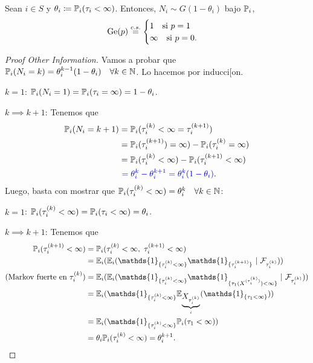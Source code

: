 \begin{prop}
	Sean $i \in S$ y $\theta_{i} \coloneq \mathbb{P}_{i}(\tau_{i} < \infty)$. Entonces, $N_{i} \sim G(1 - \theta_{i})$ bajo $\mathbb{P}_{i}$,
	\[ \operatorname{Ge}(p) \stackrel{c.s.}{=} \begin{cases}
		1 \quad \text{si } p = 1 \\
		\infty \quad \text{si } p = 0.
	\end{cases} \]
\end{prop}
\begin{proof}[Proof Other Information]
	Vamos a probar que $\mathbb{P}_{i}(N_{i} = k) = \theta_{i}^{k-1}(1 - \theta_{i}) \quad \forall k \in \mathbb{N}$. Lo hacemos por inducci[on. \par
	\underline{$k=1$}: $\mathbb{P}_{i}(N_{i} = 1) = \mathbb{P}_{i}(\tau_{i} = \infty) = 1 - \theta_{i}$. \checkmark \par
	\underline{$k \implies k+1$}: Tenemos que
	\begin{align*}
		\mathbb{P}_{i}(N_{i} = k+1) &= \mathbb{P}_{i}(\tau_{i}^{(k)} < \infty = \tau_{i}^{(k+1)}) \\
		&= \mathbb{P}_{i}(\tau_{i}^{(k+1)}) = \infty) - \mathbb{P}_{i}(\tau_{i}^{(k)} = \infty) \\
		&= \mathbb{P}_{i}(\tau_{i}^{(k)} < \infty) - \mathbb{P}_{i}(\tau_{i}^{(k+1)} < \infty) \\
		&\ \textcolor{blue}{=\theta_{i}^{k} - \theta_{i}^{k+1} = \theta_{i}^{k}(1 - \theta_{i})}
	.\end{align*}
	Luego, basta con mostrar que $\mathbb{P}_{i}(\tau_{i}^{(k)} < \infty) = \theta_{i}^{k} \quad \forall k \in \mathbb{N}$: \par
	\underline{$k = 1$}: $\mathbb{P}_{i}(\tau_{i}^{(k)} < \infty) = \mathbb{P}_{i}(\tau_{i} < \infty) = \theta_{i}$. \checkmark \par
	\underline{$k \implies k+1$}: Tenemos que
	\begin{align*}
		\mbb{P}_{i}(\tau_{i}^{(k+1)} < \infty) &= \mbb{P}_{i}(\tau_{i}^{(k)} < \infty,\ \tau_{i}^{(k+1)} < \infty) \\
		&= \mbb{E}_{i}(\mbb{E}_{i}(\mathds{1}_{\{\tau_{i}^{(k)} < \infty\}} \mathds{1}_{\{\tau_{i}^{(k+1)}\}} \ | \ \mcal{F}_{\tau_{i}^{(k)}})) \\
		(\text{Markov fuerte en $\tau_{i}^{(k)}$}) &= \mbb{E}_{i}(\mbb{E}_{i}(\mathds{1}_{\{\tau_{i}^{(k)} < \infty\}} \mathds{1}_{\{\tau_{1}(X^{(\tau_{i}^{(k)})}) < \infty\}} \ | \ \mcal{F}_{\tau_{i}^{(k)}})) \\
		&= \mbb{E}_{i}(\mathds{1}_{\{\tau_{i}^{(k)} < \infty\}}  \mbb{E}_{\underbrace{X_{\tau_{i}^{(k)}}}_{i}}(\mathds{1}_{\{\tau_{1} < \infty\}})) \\
		&= \mbb{E}_{i}(\mathds{1}_{\{\tau_{i}^{(k)} < \infty\}} \mbb{P}_{i}(\tau_{1} < \infty)) \\
		&= \theta_{i} \mbb{P}_{i}(\tau_{i}^{(k)} < \infty) = \theta_{i}^{k+1}
	.\end{align*}
\end{proof}

